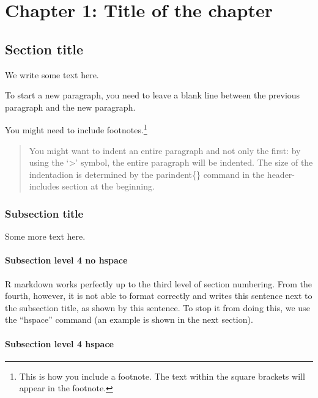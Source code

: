 \documentclass[
]{article}
\newcommand{\chapterone}{\setcounter{table}{0}
\renewcommand{\thetable}{1.\arabic{table}}
\setcounter{figure}{0}
\renewcommand{\thefigure}{1.\arabic{figure}}}
\begin{document}
\pagebreak
\chapterone

\hypertarget{chapter-1-title-of-the-chapter}{%
\section{Chapter 1: Title of the chapter}\label{chapter-1-title-of-the-chapter}}

\hypertarget{section-title}{%
\subsection{Section title}\label{section-title}}

We write some text here.

To start a new paragraph, you need to leave a blank line between the previous paragraph and the new paragraph.

You might need to include footnotes.\footnote{This is how you include a footnote. The text within the square brackets will appear in the footnote.}

\begin{quote}
You might want to indent an entire paragraph and not only the first: by using the `\textgreater{}' symbol, the entire paragraph will be indented. The size of the indentadion is determined by the parindent\{\} command in the header-includes section at the beginning.
\end{quote}

\hypertarget{subsection-title}{%
\subsubsection{Subsection title}\label{subsection-title}}

Some more text here.

\hypertarget{subsection-level-4-no-hspace}{%
\paragraph{Subsection level 4 no hspace}\label{subsection-level-4-no-hspace}}

R markdown works perfectly up to the third level of section numbering. From the fourth, however, it is not able to format correctly and writes this sentence next to the subsection title, as shown by this sentence. To stop it from doing this, we use the ``hspace'' command (an example is shown in the next section).

\hypertarget{subsection-level-4-hspace}{%
\paragraph{Subsection level 4 hspace}\label{subsection-level-4-hspace}}
\end{document}
